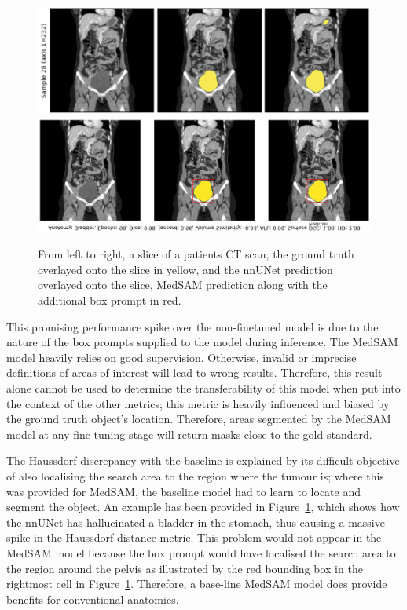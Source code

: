 \documentclass[11pt,twoside]{report}
\begin{document}
\begin{figure}[H]
  \centering
 \includegraphics[width=.7\linewidth]{../figures/bladder-nnunet-innacuracy.png}
  \includegraphics[width=.226\linewidth, trim=1000px 45px 0 0px, clip]{../figures/medsam-bladder-prediction.png}
  \caption{From left to right, a slice of a patients CT scan, the ground truth overlayed onto the slice in yellow, and the nnUNet prediction overlayed onto the slice, MedSAM prediction along with the additional box prompt in red.}\label{fig:bladder-nnunet-innacuracy}
\end{figure}%


This promising performance spike over the non-finetuned model is due to the nature of the box prompts supplied to the model during inference. The MedSAM model heavily relies on good supervision. Otherwise, invalid or imprecise definitions of areas of interest will lead to wrong results. Therefore, this result alone cannot be used to determine the transferability of this model when put into the context of the other metrics; this metric is heavily influenced and biased by the ground truth object's location. Therefore, areas segmented by the MedSAM model at any fine-tuning stage will return masks close to the gold standard.

The Haussdorf discrepancy with the baseline is explained by its difficult objective of also localising the search area to the region where the tumour is; where this was provided for MedSAM, the baseline model had to learn to locate and segment the object. An example has been provided in Figure~\ref{fig:bladder-nnunet-innacuracy}, which shows how the nnUNet has hallucinated a bladder in the stomach, thus causing a massive spike in the Haussdorf distance metric. This problem would not appear in the MedSAM model because the box prompt would have localised the search area to the region around the pelvis as illustrated by the red bounding box in the rightmost cell in Figure~\ref{fig:bladder-nnunet-innacuracy}. Therefore, a base-line MedSAM model does provide benefits for conventional anatomies.
\end{document}
